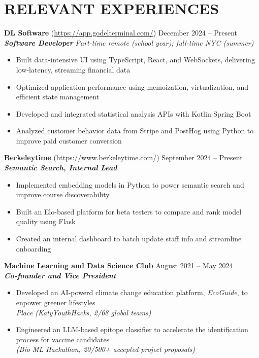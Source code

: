 \section*{RELEVANT EXPERIENCES}

\noindent
\textbf{DL Software} (\href{https://app.godelterminal.com/}{https://app.godelterminal.com/}) \hfill December 2024 -- Present \\
\textbf{\textit{Software Developer}} \hfill \textit{Part-time remote (school year); full-time NYC (summer)}
\begin{itemize}
	\item Built data-intensive UI using TypeScript, React, and WebSockets, delivering low-latency, streaming financial data
	\item Optimized application performance using memoization, virtualization, and efficient state management
	\item Developed and integrated statistical analysis APIs with Kotlin Spring Boot
	\item Analyzed customer behavior data from Stripe and PostHog using Python to improve paid customer conversion
\end{itemize}

\noindent
\textbf{Berkeleytime} (\href{https://www.berkeleytime.com/}{https://www.berkeleytime.com/}) \hfill September 2024 -- Present \\
\textbf{\textit{Semantic Search, Internal Lead}}
\begin{itemize}
	\item Implemented embedding models in Python to power semantic search and improve course discoverability
	\item Built an Elo-based platform for beta testers to compare and rank model quality using Flask
	\item Created an internal dashboard to batch update staff info and streamline onboarding
\end{itemize}

\noindent
\textbf{Machine Learning and Data Science Club} \hfill August 2021 -- May 2024 \\
\textbf{\textit{Co-founder and Vice President}}
\begin{itemize}
	\item Developed an AI-powerd climate change education platform, \textit{EcoGuide}, to enpower greener lifestyles \\ \textit{ Place (KatyYouthHacks, 2/68 global teams)}
	\item Engineered an LLM-based epitope classifier to accelerate the identification process for vaccine candidates \\ \textit{(Bio ML Hackathon, 20/500+ accepted project proposals)}
\end{itemize}

